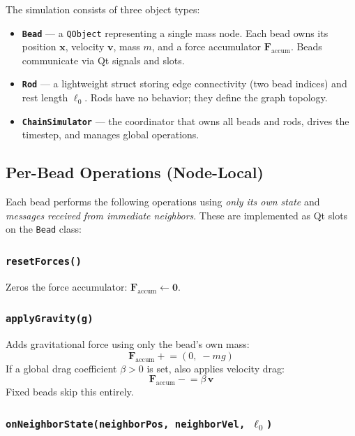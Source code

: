 \documentclass[11pt,a4paper]{article}
\begin{document}
The simulation consists of three object types:

\begin{itemize}
    \item \textbf{\texttt{Bead}} --- a \texttt{QObject} representing a single
          mass node. Each bead owns its position $\mathbf{x}$, velocity
          $\mathbf{v}$, mass $m$, and a force accumulator
          $\mathbf{F}_{\text{accum}}$. Beads communicate via Qt signals and
          slots.
    \item \textbf{\texttt{Rod}} --- a lightweight struct storing edge
          connectivity (two bead indices) and rest length $\ell_0$. Rods have
          no behavior; they define the graph topology.
    \item \textbf{\texttt{ChainSimulator}} --- the coordinator that owns all
          beads and rods, drives the timestep, and manages global operations.
\end{itemize}

\subsection{Per-Bead Operations (Node-Local)}

Each bead performs the following operations using \emph{only its own state}
and \emph{messages received from immediate neighbors}. These are implemented
as Qt slots on the \texttt{Bead} class:

\subsubsection{\texttt{resetForces()}}
Zeros the force accumulator: $\mathbf{F}_{\text{accum}} \leftarrow \mathbf{0}$.

\subsubsection{\texttt{applyGravity(g)}}
Adds gravitational force using only the bead's own mass:
\begin{equation}
    \mathbf{F}_{\text{accum}} \mathrel{+}= (0,\; -mg)
\end{equation}
If a global drag coefficient $\beta > 0$ is set, also applies velocity drag:
\begin{equation}
    \mathbf{F}_{\text{accum}} \mathrel{-}= \beta \, \mathbf{v}
\end{equation}
Fixed beads skip this entirely.

\subsubsection{\texttt{onNeighborState(neighborPos, neighborVel, $\ell_0$)}}
\label{sec:message}
\end{document}

